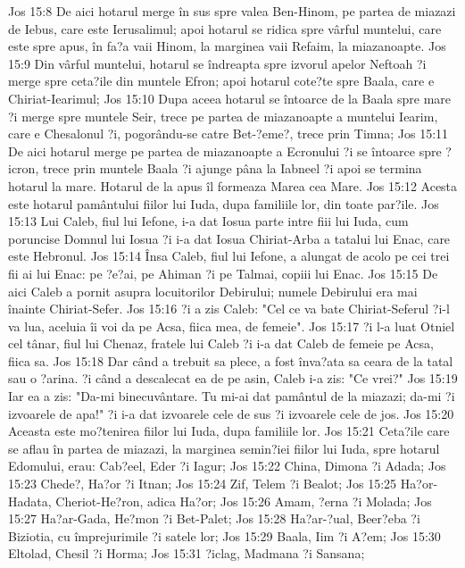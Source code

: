 Jos 15:8  De aici hotarul merge în sus spre valea Ben-Hinom, pe partea de miazazi de Iebus, care este Ierusalimul; apoi hotarul se ridica spre vârful muntelui, care este spre apus, în fa?a vaii Hinom, la marginea vaii Refaim, la miazanoapte.
Jos 15:9  Din vârful muntelui, hotarul se îndreapta spre izvorul apelor Neftoah ?i merge spre ceta?ile din muntele Efron; apoi hotarul cote?te spre Baala, care e Chiriat-Iearimul;
Jos 15:10  Dupa aceea hotarul se întoarce de la Baala spre mare ?i merge spre muntele Seir, trece pe partea de miazanoapte a muntelui Iearim, care e Chesalonul ?i, pogorându-se catre Bet-?eme?, trece prin Timna;
Jos 15:11  De aici hotarul merge pe partea de miazanoapte a Ecronului ?i se întoarce spre ?icron, trece prin muntele Baala ?i ajunge pâna la Iabneel ?i apoi se termina hotarul la mare. Hotarul de la apus îl formeaza Marea cea Mare.
Jos 15:12  Acesta este hotarul pamântului fiilor lui Iuda, dupa familiile lor, din toate par?ile.
Jos 15:13  Lui Caleb, fiul lui Iefone, i-a dat Iosua parte intre fiii lui Iuda, cum poruncise Domnul lui Iosua ?i i-a dat Iosua Chiriat-Arba a tatalui lui Enac, care este Hebronul.
Jos 15:14  Însa Caleb, fiul lui Iefone, a alungat de acolo pe cei trei fii ai lui Enac: pe ?e?ai, pe Ahiman ?i pe Talmai, copiii lui Enac.
Jos 15:15  De aici Caleb a pornit asupra locuitorilor Debirului; numele Debirului era mai înainte Chiriat-Sefer.
Jos 15:16  ?i a zis Caleb: "Cel ce va bate Chiriat-Seferul ?i-l va lua, aceluia îi voi da pe Acsa, fiica mea, de femeie".
Jos 15:17  ?i l-a luat Otniel cel tânar, fiul lui Chenaz, fratele lui Caleb ?i i-a dat Caleb de femeie pe Acsa, fiica sa.
Jos 15:18  Dar când a trebuit sa plece, a fost înva?ata sa ceara de la tatal sau o ?arina. ?i când a descalecat ea de pe asin, Caleb i-a zis: "Ce vrei?"
Jos 15:19  Iar ea a zis: "Da-mi binecuvântare. Tu mi-ai dat pamântul de la miazazi; da-mi ?i izvoarele de apa!" ?i i-a dat izvoarele cele de sus ?i izvoarele cele de jos.
Jos 15:20  Aceasta este mo?tenirea fiilor lui Iuda, dupa familiile lor.
Jos 15:21  Ceta?ile care se aflau în partea de miazazi, la marginea semin?iei fiilor lui Iuda, spre hotarul Edomului, erau: Cab?eel, Eder ?i Iagur;
Jos 15:22  China, Dimona ?i Adada;
Jos 15:23  Chede?, Ha?or ?i Itnan;
Jos 15:24  Zif, Telem ?i Bealot;
Jos 15:25  Ha?or-Hadata, Cheriot-He?ron, adica Ha?or;
Jos 15:26  Amam, ?erna ?i Molada;
Jos 15:27  Ha?ar-Gada, He?mon ?i Bet-Palet;
Jos 15:28  Ha?ar-?ual, Beer?eba ?i Biziotia, cu împrejurimile ?i satele lor;
Jos 15:29  Baala, Iim ?i A?em;
Jos 15:30  Eltolad, Chesil ?i Horma;
Jos 15:31  ?iclag, Madmana ?i Sansana;
